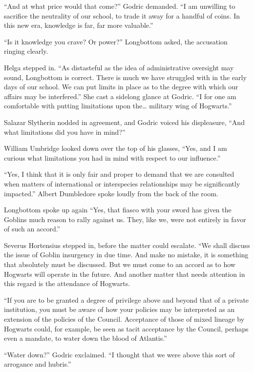 “And at what price would that come?” Godric demanded. “I am unwilling to sacrifice the neutrality of our school, to trade it away for a handful of coins. In this new era, knowledge is far, far more valuable.”

“Is it knowledge you crave? Or power?” Longbottom asked, the accusation ringing clearly.

Helga stepped in. “As distasteful as the idea of administrative oversight may sound, Longbottom is correct. There is much we have struggled with in the early days of our school. We can put limits in place as to the degree with which our affairs may be interfered.” She cast a sidelong glance at Godric. “I for one am comfortable with putting limitations upon the… military wing of Hogwarts.”

Salazar Slytherin nodded in agreement, and Godric voiced his displeasure, “And what limitations did you have in mind?”

William Umbridge looked down over the top of his glasses, “Yes, and I am curious what limitations you had in mind with respect to our influence.”

“Yes, I think that it is only fair and proper to demand that we are consulted when matters of international or interspecies relationships may be significantly impacted.” Albert Dumbledore spoke loudly from the back of the room.

Longbottom spoke up again “Yes, that fiasco with your sword has given the Goblins much reason to rally against us. They, like we, were not entirely in favor of such an accord.”

Severus Hortensius stepped in, before the matter could escalate. “We shall discuss the issue of Goblin insurgency in due time. And make no mistake, it is something that absolutely must be discussed. But we must come to an accord as to how Hogwarts will operate in the future. And another matter that needs attention in this regard is the attendance of Hogwarts.

“If you are to be granted a degree of privilege above and beyond that of a private institution, you must be aware of how your policies may be interpreted as an extension of the policies of the Council. Acceptance of those of mixed lineage by Hogwarts could, for example, be seen as tacit acceptance by the Council, perhaps even a mandate, to water down the blood of Atlantis.”

“Water down?” Godric exclaimed. “I thought that we were above this sort of arrogance and hubris.”

